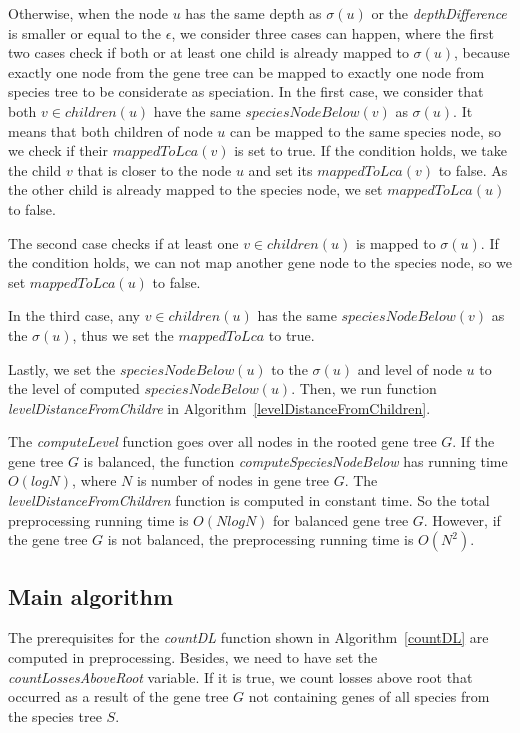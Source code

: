 Otherwise, when the node $u$ has the same depth as $\sigma(u)$ or the \emph{depthDifference} is smaller or equal to the $\epsilon$, we consider three cases can happen, where the first two cases check if both or at least one child is already mapped to $\sigma(u)$, because exactly one node from the gene tree can be mapped to exactly one node from species tree to be considerate as speciation. In the first case, we consider that both $v \in children(u)$ have the same $speciesNodeBelow(v)$ as $\sigma(u)$. It means that both children of node $u$ can be mapped to the same species node, so we check if their $mappedToLca(v)$ is set to true. If the condition holds, we take the child $v$ that is closer to the node $u$ and set its $mappedToLca(v)$ to false. As the other child is already mapped to the species node, we set $mappedToLca(u)$ to false.

The second case checks if at least one $v \in children(u)$ is mapped to $\sigma(u)$. If the condition holds, we can not map another gene node to the species node, so we set $mappedToLca(u)$ to false. 

In the third case, any $v \in children (u)$ has the same $speciesNodeBelow(v)$ as the $\sigma(u)$, thus we set the $mappedToLca$ to true.

Lastly, we set the $speciesNodeBelow(u)$ to the $\sigma(u)$ and level of node $u$ to the level of computed $speciesNodeBelow(u)$. Then, we run function \emph{levelDistanceFromChildre} in Algorithm~\ref{levelDistanceFromChildren}.

The \emph{computeLevel} function goes over all nodes in the rooted gene tree $G$. If the gene tree $G$ is balanced, the function \emph{computeSpeciesNodeBelow} has running time $O(log N)$, where $N$ is number of nodes in gene tree $G$. The \emph{levelDistanceFromChildren} function is computed in constant time. So the total preprocessing running time is $O(N log N)$ for balanced gene tree $G$. However, if the gene tree $G$ is not balanced, the preprocessing running time is $O(N^2)$.

\subsection{Main algorithm} \label{main_algorithm}

The prerequisites for the \emph{countDL} function shown in Algorithm~\ref{countDL} are computed in preprocessing. Besides, we need to have set the \emph{countLossesAboveRoot} variable. If it is true, we count losses above root that occurred as a result of the gene tree $G$ not containing genes of all species from the species tree $S$. 

